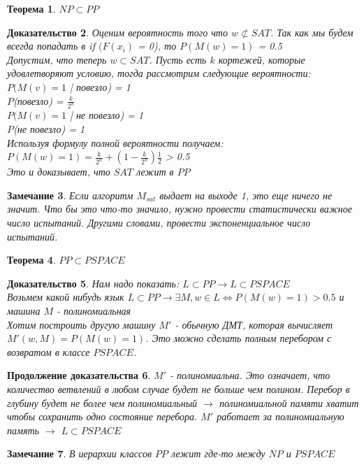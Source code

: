\documentclass{beamer}
\theoremstyle{plain}
\newtheorem{thm}{Теорема}
\newtheorem{rmk}[thm]{Замечание}
\newtheorem{proof-rus}[thm]{Доказательство}
\newtheorem{proof-rus-cont}[thm]{Продолжение доказательства}
\theoremstyle{definition}
\begin{document}
\begin{frame}
    \begin{thm}
    $ NP \subset PP $
    \end{thm}
    \begin{proof-rus}
    Оценим вероятность того что $ w \not\subset SAT $. Так как мы будем всегда попадать в if $(F(x_i)$ = 0), то $P(M(w)=1)$ = 0.5 \\
    
    Допустим, что теперь $ w \subset SAT $.
    Пусть есть $k$ кортежей, которые удовлетворяют условию, тогда 
    рассмотрим следующие вероятности: \\
    $ P(M(v)=1$ | повезло) = 1  \\
    $ P $(повезло) = $\frac{k}{2^n} $ \\
    $ P(M(v)=1$ | не повезло) = 1 \\
    $ P $(не повезло) = 1 \\
    Используя формулу полной вероятности получаем: \\
    $ P(M(w)=1) = \frac{k}{2^n} + (1 - \frac{k}{2^n})\frac{1}{2}$ > 0.5 \\
    Это и доказывает, что $SAT$ лежит в $PP$
    \end {proof-rus}
    
\end{frame}

\begin{frame}
    \begin{rmk}
    Если алгоритм $M_{sat}$ выдает на выходе 1, это еще ничего не значит. Что бы это что-то значило, нужно провести статистически важное число испытаний. Другими словами, провести экспоненциальное число испытаний.
    \end{rmk}
    \begin{thm}
    $ PP \subset PSPACE $
    \end{thm}
    \begin{proof-rus}
    Нам надо показать: $ L \subset  PP \rightarrow L \subset  PSPACE $\\
    Возьмем какой нибудь язык $ L \subset PP \rightarrow \exists M, w \in L \Leftrightarrow P(M(w)=1)>0.5$ и машина $M$ - полиномиальная \\
    Хотим построить другую машину $M'$ - обычную ДМТ, которая вычисляет $ M'(w, M) = P(M(w)=1)$. Это можно сделать полным перебором с возвратом в классе $PSPACE$.
    \end{proof-rus}
\end{frame}

\begin{frame}
    \begin{proof-rus-cont}
    $M'$ - полиномиальна. Это означает, что количество ветвлений в любом случае будет не больше чем полином.
    Перебор в глубину будет не более чем полиномиальный $\rightarrow$ полиномиальной памяти хватит чтобы сохранить одно состояние перебора. $M'$ работает за полиномиальную память $\rightarrow$ $ L \subset PSPACE $
    \end{proof-rus-cont}
    \begin{rmk}
    В иерархии классов $PP$ лежит где-то между $NP$ и $PSPACE$
    \end{rmk}
\end{frame}
\end{document}

